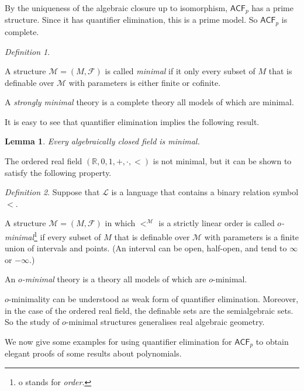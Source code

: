 \documentclass[a4paper, 11pt]{amsart}
\newtheorem{lemma}[lemma]{Lemma}
\theoremstyle{remark}
\newtheorem{definition}[definition]{Definition}
\newcommand{\RR}{\mathbb{R}}
\newcommand{\cF}{\mathcal F}
\newcommand{\cL}{\mathcal L}
\newcommand{\cM}{\mathcal M}
\newenvironment{enumerate-(1)}{\begin{enumerate}[label={\upshape (\arabic*)}, leftmargin=2pc]}{\end{enumerate}}
\begin{document}
By the uniqueness of the algebraic closure up to isomorphism, $\mathsf{ACF}_p$ has a prime structure. 
Since it has quantifier elimination, this is a prime model. 
So $\mathsf{ACF}_p$ is complete. 

\begin{definition} \ 
\begin{enumerate-(1)} 
\item 
A structure $\cM= (M,\cF)$ is called \emph{minimal} if it only every subset of $M$ that is definable over $\cM$ with parameters is either finite or cofinite. 
\item 
A \emph{strongly minimal} theory is a complete theory all models of which are minimal. 
\end{enumerate-(1)} 
\end{definition} 

It is easy to see that quantifier elimination implies the following result. 

\begin{lemma} 
Every algebraically closed field is minimal. 
\end{lemma} 

The ordered real field $(\RR,0,1,+,\cdot,<)$ is not minimal, but it can be shown to satisfy the  following property. 


\begin{definition} 
Suppose that $\cL$ is a language that contains a binary relation symbol $<$. 
\begin{enumerate-(1)} 
\item 
A structure $\cM= (M,\cF)$ in which $<^\cM$ is a strictly linear order is called \emph{$o$-minimal}\footnote{o stands for \emph{order}.} if every subset of $M$ that is definable over $\cM$ with parameters is a finite union of intervals and points. (An interval can be open, half-open, and tend to $\infty$ or $-\infty$.) 
\item 
An \emph{$o$-minimal} theory is a theory all models of which are $o$-minimal. 
\end{enumerate-(1)} 
\end{definition} 

$o$-minimality can be understood as weak form of quantifier elimination. 
Moreover, in the case of the ordered real field, the definable sets are the semialgebraic sets. 
So the study of $o$-minimal structures generalises real algebraic geometry. 


We now give some examples for using quantifier elimination for $\mathsf{ACF}_p$ to obtain elegant proofs of some results about polynomials. 
\end{document}
